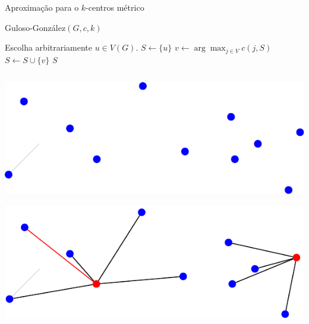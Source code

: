 \documentclass[final]{beamer}
\begin{document}
\begin{frame}[t]
\begin{columns}[t]
\begin{column}{0.47\paperwidth}
\begin{block}{Aproximação para o $k$-centros métrico}
          \begin{shaded}
            \vspace{-.65cm}
            \begin{algorithm}[H]
              \caption{Guloso-González$(G,c,k)$}
              \begin{algorithmic}[1]
                \State Escolha arbitrariamente $u \in V(G)$.
                \State $S \gets \{u\}$
                \State $v \gets \arg\max_{j \in V} c(j,S)$
                \State $S \gets S \cup \{v\}$
                \EndWhile
                \State\Return $S$
              \end{algorithmic}
            \end{algorithm}
            \vspace{-.65cm}
          \end{shaded}
        


      \begin{columns}
        \begin{column}{0.23\paperwidth}
        
            \begin{tcolorbox}
              \includegraphics[scale=1.2]{imgs/local-search1.pdf}
            \end{tcolorbox}
            
            \begin{tcolorbox}
              \includegraphics[scale=1.2]{imgs/cent3.pdf}
            \end{tcolorbox}
         \end{column}


\end{columns}
\end{block}
\end{column}
\end{columns}
\end{frame}
\end{document}
